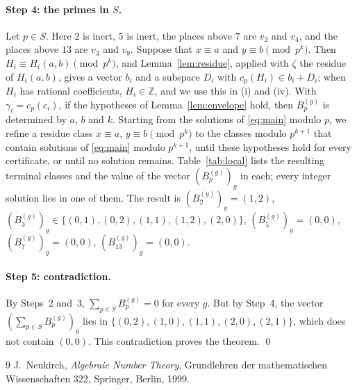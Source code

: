 \documentclass[11pt]{article}
\newcommand{\Z}{\mathbb{Z}}
\begin{document}
\paragraph{Step 4: the primes in $S$.} Let $p\in S$. Here $2$ is inert, $5$ is inert, the places above $7$ are $v_{2}$ and $v_{4}$, and the places above $13$ are $v_{3}$ and $v_{9}$. Suppose that $x\equiv a$ and $y\equiv b\pmod{p^k}$. Then $H_i\equiv H_i(a,b)\pmod{p^k}$, and Lemma~\ref{lem:residue}, applied with $\zeta$ the residue of $H_i(a,b)$, gives a vector $b_i$ and a subspace $D_i$ with $c_p(H_i)\in b_i+D_i$; when $H_i$ has rational coefficients, $H_i\in\Z$, and we use this in (i) and (iv). With $\gamma_i=c_p(c_i)$, if the hypotheses of Lemma~\ref{lem:envelope} hold, then $B^{(g)}_p$ is determined by $a$, $b$ and $k$. Starting from the solutions of \eqref{eq:main} modulo $p$, we refine a residue class $x\equiv a$, $y\equiv b\pmod{p^k}$ to the classes modulo $p^{k+1}$ that contain solutions of \eqref{eq:main} modulo $p^{k+1}$, until these hypotheses hold for every certificate, or until no solution remains. Table~\ref{tab:local} lists the resulting terminal classes and the value of the vector $(B^{(g)}_p)_g$ in each; every integer solution lies in one of them. The result is $(B^{(g)}_{2})_g=(1,2)$, $(B^{(g)}_{3})_g\in\{(0,1),\allowbreak (0,2),\allowbreak (1,1),\allowbreak (1,2),\allowbreak (2,0)\}$, $(B^{(g)}_{5})_g=(0,0)$, $(B^{(g)}_{7})_g=(0,0)$, $(B^{(g)}_{13})_g=(0,0)$.

\paragraph{Step 5: contradiction.} By Steps~2 and~3, $\sum_{p\in S}B^{(g)}_p=0$ for every $g$. But by Step~4, the vector $(\sum_{p\in S}B^{(g)}_p)_g$ lies in $\{(0,2),\allowbreak (1,0),\allowbreak (1,1),\allowbreak (2,0),\allowbreak (2,1)\}$, which does not contain $(0,0)$. This contradiction proves the theorem.
\qed


\begin{thebibliography}{9}
 J.~Neukirch, \emph{Algebraic Number Theory}, Grundlehren der mathematischen Wissenschaften 322, Springer, Berlin, 1999.
\end{thebibliography}
\end{document}
